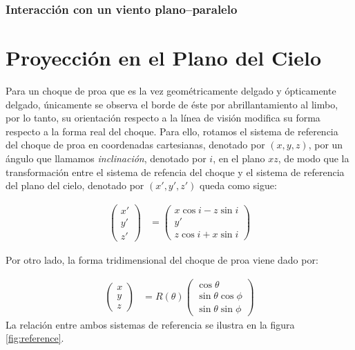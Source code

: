\subsubsection{Interacción con un viento plano--paralelo}

\section{Proyección en el Plano del Cielo}
\label{sec:projection}

Para un choque de proa que es la vez geométricamente delgado y
ópticamente delgado, únicamente se observa el borde de éste por
abrillantamiento al limbo, por lo tanto, su orientación respecto a
la línea de visión modifica su forma respecto a la forma real del
choque. Para ello, rotamos el sistema de referencia del choque de proa
en coordenadas cartesianas, denotado por $(x, y, z)$, por un ángulo
que llamamos \textit{inclinación}, denotado por $i$, en el plano $xz$,
de modo que la transformación entre el sistema de refencia del choque
y el sistema de referencia del plano del cielo, denotado por
$(x', y', z')$ queda como sigue:

\begin{align}
  \left(
  \begin{array}{c}
    x' \\ y' \\ z'
  \end{array}
  \right) &=
  \left(
  \begin{array}{c}
    x\cos i - z\sin i \\ y' \\ z\cos i + x\sin i
  \end{array}
  \right)
  \label{eq:rotation}
\end{align}

Por otro lado, la forma tridimensional del choque de proa viene dado por:

\begin{align}
  \left(
  \begin{array}{c}
    x \\ y \\ z
  \end{array}
  \right) &=
            R(\theta)\left(
            \begin{array}{c}
              \cos\theta \\
              \sin\theta\cos\phi \\
              \sin\theta\sin\phi
            \end{array}
            \right)
\end{align}
La relación entre ambos sistemas de referencia se ilustra en la figura
\ref{fig:reference}.

